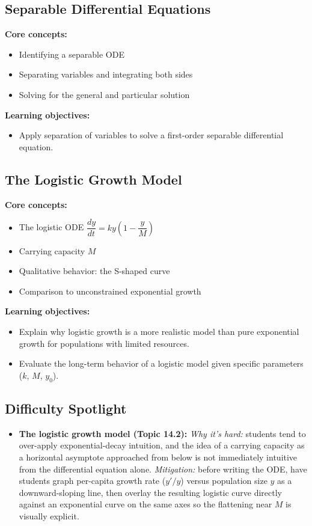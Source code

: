 \documentclass{article}
\begin{document}
\subsection{Separable Differential Equations}
\textbf{Core concepts:}
\begin{itemize}[leftmargin=*]
  \item Identifying a separable ODE
  \item Separating variables and integrating both sides
  \item Solving for the general and particular solution
\end{itemize}
\textbf{Learning objectives:}
\begin{itemize}[leftmargin=*]
  \item Apply separation of variables to solve a first-order separable differential equation.
\end{itemize}

\subsection{The Logistic Growth Model}
\textbf{Core concepts:}
\begin{itemize}[leftmargin=*]
  \item The logistic ODE $\dfrac{dy}{dt} = ky\left(1-\dfrac{y}{M}\right)$
  \item Carrying capacity $M$
  \item Qualitative behavior: the S-shaped curve
  \item Comparison to unconstrained exponential growth
\end{itemize}
\textbf{Learning objectives:}
\begin{itemize}[leftmargin=*]
  \item Explain why logistic growth is a more realistic model than pure exponential growth for populations with limited resources.
  \item Evaluate the long-term behavior of a logistic model given specific parameters ($k$, $M$, $y_0$).
\end{itemize}

\subsection*{Difficulty Spotlight}
\begin{itemize}[leftmargin=*]
  \item \textbf{The logistic growth model (Topic 14.2):} \textit{Why it's hard:} students tend to over-apply exponential-decay intuition, and the idea of a carrying capacity as a horizontal asymptote approached from below is not immediately intuitive from the differential equation alone. \textit{Mitigation:} before writing the ODE, have students graph per-capita growth rate ($y'/y$) versus population size $y$ as a downward-sloping line, then overlay the resulting logistic curve directly against an exponential curve on the same axes so the flattening near $M$ is visually explicit.
\end{itemize}
\end{document}
